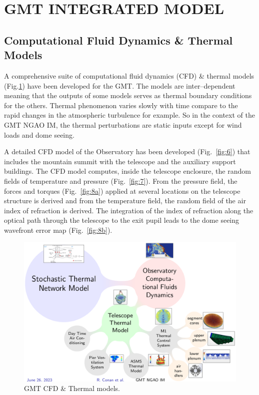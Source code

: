 \documentclass[]{AO4ELT}  %
\begin{document}
\clearpage

\section{GMT INTEGRATED MODEL}
\label{seg:gmt-im}

\subsection{Computational Fluid Dynamics \& Thermal Models}
\label{sec:cfd}

A comprehensive suite of computational fluid dynamics (CFD) \& thermal models (Fig.\ref{fig:5}) have been developed for the GMT.
The models are inter--dependent meaning that the outputs of some models serves as thermal boundary conditions for the others.
Thermal phenomenon varies slowly with time compare to the rapid changes in the atmospheric turbulence for example.
So in the context of the GMT NGAO IM, the thermal perturbations are static inputs except for wind loads and dome seeing.

A detailed CFD model of the Observatory has been developed (Fig.~\ref{fig:6}) that includes the mountain summit
with the telescope and the auxiliary support buildings.
The CFD model computes, inside the telescope enclosure, the random fields of temperature and pressure (Fig.~\ref{fig:7}).
From the pressure field, the forces and torques (Fig.~\ref{fig:8a}) applied at several locations on the telescope structure is derived and
from the temperature field, the random field of the air index of refraction is derived.
The integration of the index of refraction along the optical path through the telescope
to the exit pupil leads to the dome seeing wavefront error map (Fig.~\ref{fig:8b}).

\begin{figure}
   \centering
   \includegraphics[width=0.7\linewidth]{cfd-thermal_models.png}
   \caption{GMT CFD \& Thermal models.}
   \label{fig:5}
\end{figure}
\end{document}
